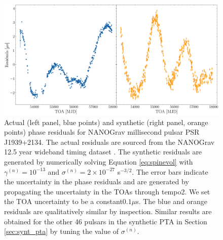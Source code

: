\documentclass[fleqn,usenatbib,useAMS]{mnras}
\providecommand{\DIFadd}[1]{{\protect\color{blue}\uwave{#1}}} %
\providecommand{\DIFaddend}{} %
\providecommand{\DIFaddFL}[1]{\DIFadd{#1}} %
\providecommand{\DIFaddbeginFL}{} %
\providecommand{\DIFaddendFL}{} %
\newcommand{\DIFaddincludegraphics}[2][]{{\color{blue}\fbox{\DIFOincludegraphics[#1]{#2}}}} %
\DeclareRobustCommand{\DIFaddend}{\DIFOaddend \let\includegraphics\DIFOincludegraphics} %
\DeclareRobustCommand{\DIFaddbeginFL}{\DIFOaddbeginFL \let\includegraphics\DIFaddincludegraphics} %
\DeclareRobustCommand{\DIFaddendFL}{\DIFOaddendFL \let\includegraphics\DIFOincludegraphics} %
\begin{document}





\DIFaddend \begin{figure}
	\includegraphics[width=\columnwidth]{images/example_residuals_plot2}
	\caption{Actual (left panel, blue points) and synthetic (right panel, orange points) phase residuals for NANOGrav millisecond pulsar PSR J1939+2134. The actual residuals are sourced from the NANOGrav 12.5 year wideband timing dataset \citep{pennucci_timothy_t_2020_4312887,nanogravwideband}. The synthetic residuals are generated by numerically solving Equation \eqref{eq:spinevol} with $\gamma^{(n)} = 10^{-13}$ and $\sigma^{(n)} = 2\times 10^{-27}$ s$^{-3/2}$. The error bars indicate the uncertainty in the phase residuals and are generated by propagating the uncertainty in the TOAs through {\sc tempo2}. We set the TOA uncertainty to be a constant\DIFaddbeginFL \DIFaddFL{, }\DIFaddendFL $0.1 \mu$s. The blue and orange residuals are qualitatively similar by inspection. Similar results are obtained for the other 46 pulsars in the synthetic PTA in Section \ref{sec:synt_pta} by tuning the value of $\sigma^{(n)}$.}
	\label{fig:qualitative_compare}
\end{figure}
\end{document}
